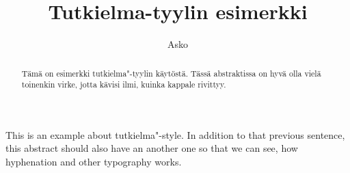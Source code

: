 \documentclass{tutkielma}
\title{Tutkielma-tyylin esimerkki}
\author{Asko}{Tapani}{Soukka}
\begin{document}
\maketitle

\begin{abstract}

\noindent Tämä on esimerkki tutkielma"-tyylin käytöstä.
Tässä abstraktissa on hyvä olla vielä toinenkin virke,
jotta kävisi ilmi, kuinka kappale rivittyy.

\end{abstract}

\begin{foreignabstract}

\noindent This is an example about tutkielma"-style.
In addition to that previous sentence, this abstract should also have
an another one so that we can see, how hyphenation and other
typography works.

\end{foreignabstract}

\tableofcontents





\appendix


\end{document}

